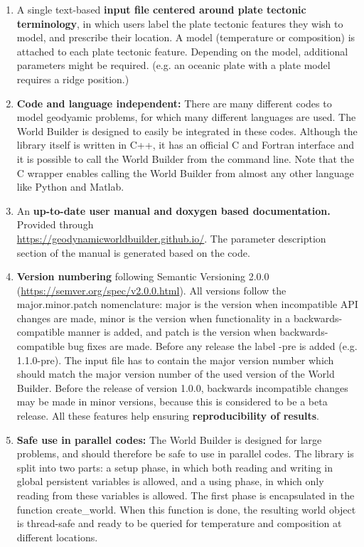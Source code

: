 \documentclass{book}
\newcommand{\WB}{{World Builder}}
\begin{document}
\begin{enumerate}
    \item A single text-based {\bf input file centered around plate tectonic terminology}, in which users label the plate tectonic features they wish to model, and prescribe their location. A model (temperature or composition) is attached to each plate tectonic feature. Depending on the model, additional parameters might be required. (e.g. an oceanic plate with a plate model requires a ridge position.) 
    \item {\bf Code and language independent:} There are many different codes to model geodyamic problems, for which many different languages are used. The \WB{} is designed to easily be integrated in these codes. Although the library itself is written in C++, it has an official C and Fortran interface and it is possible to call the \WB{} from the command line. Note that the C wrapper enables calling the \WB{} from almost any other language like Python and Matlab. 
    \item An {\bf up-to-date user manual and doxygen based documentation.} Provided through \\ \url{https://geodynamicworldbuilder.github.io/}. The parameter description section of the manual is generated based on the code.

    \item {\bf Version numbering } following Semantic Versioning 2.0.0 (\url{https://semver.org/spec/v2.0.0.html}).
    All versions follow the major.minor.patch nomenclature: major is the version when incompatible API changes are made, minor is the version when functionality in a backwards-compatible manner is added, and patch is the version when backwards-compatible bug fixes are made. Before any release the label -pre is added (e.g. 1.1.0-pre). The input file has to contain the major version number which should match the major version number of the used version of the \WB{}. Before the release of version 1.0.0, backwards incompatible changes may be made in minor versions, because this is considered to be a beta release. All these features help ensuring {\bf reproducibility of results}.

    \item {\bf Safe use in parallel codes:} The \WB{} is designed for large problems, and should therefore be safe to use in parallel codes. The library is split into two parts: a setup phase, in which both reading and writing in global persistent variables is allowed, and a using phase, in which only reading from these variables is allowed. The first phase is encapsulated in the function create\_world. When this function is done, the resulting world object is thread-safe and ready to be queried for temperature and composition at different locations.
    

\end{enumerate}
\end{document}
